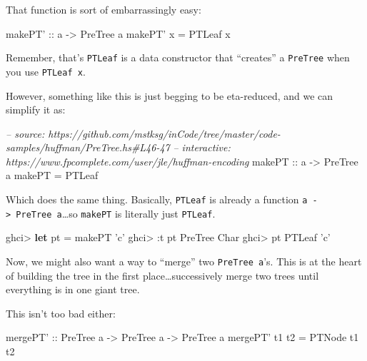 \documentclass[]{article}
\newenvironment{Shaded}{\begin{snugshade}}{\end{snugshade}}
\newcommand{\CharTok}[1]{\textcolor[rgb]{0.31,0.60,0.02}{#1}}
\newcommand{\CommentTok}[1]{\textcolor[rgb]{0.56,0.35,0.01}{\textit{#1}}}
\newcommand{\DataTypeTok}[1]{\textcolor[rgb]{0.13,0.29,0.53}{#1}}
\newcommand{\FunctionTok}[1]{\textcolor[rgb]{0.00,0.00,0.00}{#1}}
\newcommand{\KeywordTok}[1]{\textcolor[rgb]{0.13,0.29,0.53}{\textbf{#1}}}
\newcommand{\NormalTok}[1]{#1}
\newcommand{\OtherTok}[1]{\textcolor[rgb]{0.56,0.35,0.01}{#1}}
\begin{document}
That function is sort of embarrassingly easy:

\begin{Shaded}
\begin{Highlighting}[]
\OtherTok{makePT' ::}\NormalTok{ a }\OtherTok{->} \DataTypeTok{PreTree}\NormalTok{ a}
\NormalTok{makePT' x }\FunctionTok{=} \DataTypeTok{PTLeaf}\NormalTok{ x}
\end{Highlighting}
\end{Shaded}

Remember, that's \texttt{PTLeaf} is a data constructor that ``creates'' a
\texttt{PreTree} when you use \texttt{PTLeaf\ x}.

However, something like this is just begging to be eta-reduced, and we can
simplify it as:

\begin{Shaded}
\begin{Highlighting}[]
\CommentTok{-- source: https://github.com/mstksg/inCode/tree/master/code-samples/huffman/PreTree.hs#L46-47}
\CommentTok{-- interactive: https://www.fpcomplete.com/user/jle/huffman-encoding}
\OtherTok{makePT ::}\NormalTok{ a }\OtherTok{->} \DataTypeTok{PreTree}\NormalTok{ a}
\NormalTok{makePT }\FunctionTok{=} \DataTypeTok{PTLeaf}
\end{Highlighting}
\end{Shaded}

Which does the same thing. Basically, \texttt{PTLeaf} is already a function
\texttt{a\ -\textgreater{}\ PreTree\ a}\ldots{}so \texttt{makePT} is literally
just \texttt{PTLeaf}.

\begin{Shaded}
\begin{Highlighting}[]
\NormalTok{ghci}\FunctionTok{>} \KeywordTok{let}\NormalTok{ pt }\FunctionTok{=}\NormalTok{ makePT }\CharTok{'c'}
\NormalTok{ghci}\FunctionTok{>} \FunctionTok{:}\NormalTok{t pt}
\DataTypeTok{PreTree} \DataTypeTok{Char}
\NormalTok{ghci}\FunctionTok{>}\NormalTok{ pt}
\DataTypeTok{PTLeaf} \CharTok{'c'}
\end{Highlighting}
\end{Shaded}

Now, we might also want a way to ``merge'' two \texttt{PreTree\ a}'s. This is at
the heart of building the tree in the first place\ldots{}successively merge two
trees until everything is in one giant tree.

This isn't too bad either:

\begin{Shaded}
\begin{Highlighting}[]
\OtherTok{mergePT' ::} \DataTypeTok{PreTree}\NormalTok{ a }\OtherTok{->} \DataTypeTok{PreTree}\NormalTok{ a }\OtherTok{->} \DataTypeTok{PreTree}\NormalTok{ a}
\NormalTok{mergePT' t1 t2 }\FunctionTok{=} \DataTypeTok{PTNode}\NormalTok{ t1 t2}
\end{Highlighting}
\end{Shaded}
\end{document}

